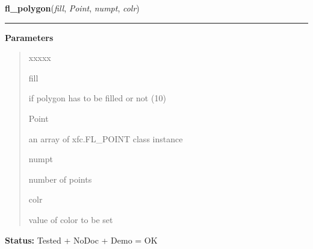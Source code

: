     \label{xformslib:library:fl_polygon}

    \vspace{0.5ex}

\hspace{.8\funcindent}\begin{boxedminipage}{\funcwidth}

    \raggedright \textbf{fl\_polygon}(\textit{fill}, \textit{Point}, \textit{numpt}, \textit{colr})

    \vspace{-1.5ex}

    \rule{\textwidth}{0.5\fboxrule}
\setlength{\parskip}{2ex}
\setlength{\parskip}{1ex}
      \textbf{Parameters}
      \vspace{-1ex}

      \begin{quote}
        \begin{Ventry}{xxxxx}

          \item[fill]

          if polygon has to be filled or not (1{\textbar}0)

          \item[Point]

          an array of xfc.FL\_POINT class instance

          \item[numpt]

          number of points

          \item[colr]

          value of color to be set

        \end{Ventry}

      \end{quote}

\textbf{Status:} Tested + NoDoc + Demo = OK



    \end{boxedminipage}

    \label{xformslib:library:fl_polyf}

    \vspace{0.5ex}

